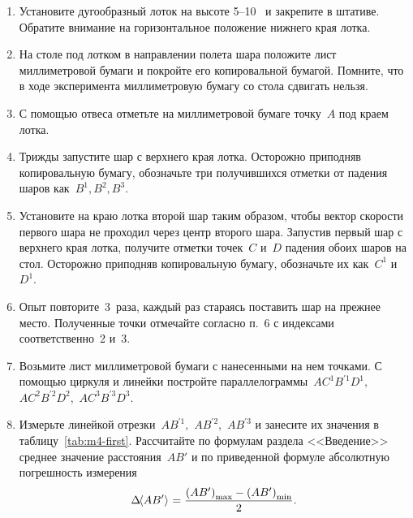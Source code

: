 \documentclass[a4paper, 12pt]{extarticle}
\begin{document}
\begin{enumerate}
  \item Установите дугообразный лоток на высоте 5--10~ и закрепите в штативе. Обратите внимание на горизонтальное положение нижнего края лотка.

  \item На столе под лотком в направлении полета шара положите лист миллиметровой бумаги и покройте его копировальной бумагой. Помните, что в ходе эксперимента миллиметровую бумагу со стола сдвигать нельзя.
  \item С помощью отвеса отметьте на миллиметровой бумаге точку~$A$ под краем лотка.
  \item Трижды запустите шар с верхнего края лотка. %
      Осторожно приподняв копировальную бумагу, обозначьте три получившихся отметки от падения шаров как~$B^1, B^2, B^3.$
  \item Установите на краю лотка второй шар таким образом, чтобы вектор скорости первого шара не проходил через центр второго шара.
      Запустив первый шар с верхнего края лотка, получите отметки точек~$C$ и~$D$ падения обоих шаров на стол. Осторожно приподняв копировальную бумагу, обозначьте их как~$C^1$ и~$D^1$.

      \item
      Опыт повторите~3~раза, каждый раз стараясь поставить шар на прежнее место. Полученные точки отмечайте согласно п.~6 с индексами соответственно~2 и~3.
      \item Возьмите лист миллиметровой бумаги с нанесенными на нем точками. С помощью циркуля и линейки постройте параллелограммы~$A C^1 {B}^{'1} D^1,$ $A C^2 {B}^{'2} D^2,$ $A C^3 {B}^{'3} D^3.$ %
      \item Измерьте линейкой отрезки~$A{B}^{'1},$ $A{B}^{'2},$ $A{B}^{'3}$ и занесите их значения в таблицу~\ref{tab:m4-first}. Рассчитайте по формулам раздела <<Введение>> среднее значение %
расстояния~$AB'$ и по приведенной формуле абсолютную погрешность измерения
          \begin{equation} %
          \label{m4:value-deltaABs}
          \Delta \MTDMean{AB'}\ = \frac{\left(AB'\right)_{\max} - \left(AB'\right)_{\min}}{2}.
          \end{equation}


\end{enumerate}
\end{document}
